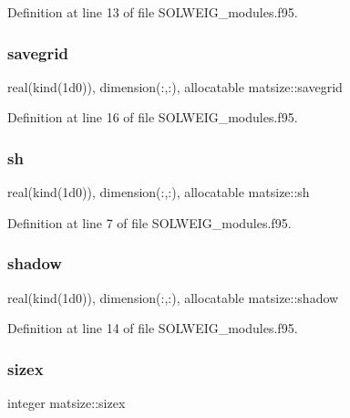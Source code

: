 Definition at line 13 of file S\+O\+L\+W\+E\+I\+G\+\_\+modules.\+f95.

\mbox{\label{namespacematsize_a955b428c1737be712b663eeca12e7446}} 
\subsubsection{\texorpdfstring{savegrid}{savegrid}}
{\footnotesize\ttfamily real(kind(1d0)), dimension(\+:,\+:), allocatable matsize\+::savegrid}



Definition at line 16 of file S\+O\+L\+W\+E\+I\+G\+\_\+modules.\+f95.

\mbox{\label{namespacematsize_a8646e77bed1b06a41e4d3d230df88854}} 
\subsubsection{\texorpdfstring{sh}{sh}}
{\footnotesize\ttfamily real(kind(1d0)), dimension(\+:,\+:), allocatable matsize\+::sh}



Definition at line 7 of file S\+O\+L\+W\+E\+I\+G\+\_\+modules.\+f95.

\mbox{\label{namespacematsize_a3d9d89d00fce455db2334993b50c5e74}} 
\subsubsection{\texorpdfstring{shadow}{shadow}}
{\footnotesize\ttfamily real(kind(1d0)), dimension(\+:,\+:), allocatable matsize\+::shadow}



Definition at line 14 of file S\+O\+L\+W\+E\+I\+G\+\_\+modules.\+f95.

\mbox{\label{namespacematsize_ab94e75e382a77f33021c061c1fd031ba}} 
\subsubsection{\texorpdfstring{sizex}{sizex}}
{\footnotesize\ttfamily integer matsize\+::sizex}



